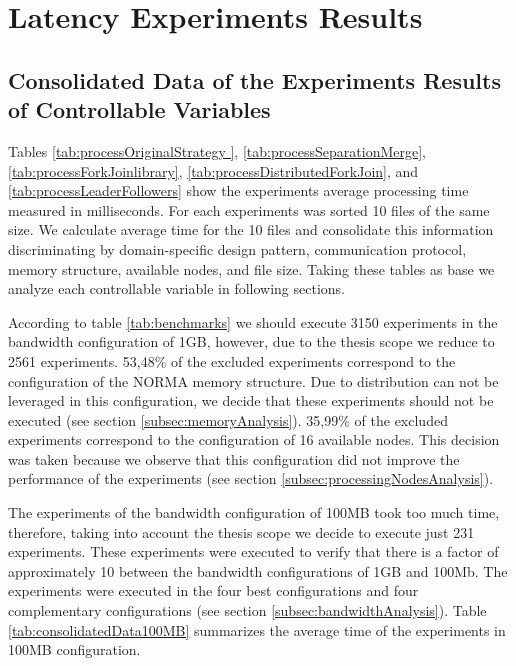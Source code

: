 \section{Latency Experiments Results}

\subsection{Consolidated Data of the Experiments Results of Controllable Variables}

Tables \ref{tab:processOriginalStrategy }, \ref{tab:processSeparationMerge}, \ref{tab:processForkJoinlibrary}, \ref{tab:processDistributedForkJoin}, and \ref{tab:processLeaderFollowers} show the experiments average processing time measured in milliseconds. For each experiments was sorted 10 files of the same size. We calculate average time for the 10 files and consolidate this information discriminating by domain-specific design pattern, communication protocol, memory structure, available nodes, and file size. Taking these tables as base we analyze each controllable variable in following sections.

According to table \ref{tab:benchmarks} we should execute 3150 experiments in the bandwidth configuration of 1GB, however, due to the thesis scope we reduce to 2561 experiments. 53,48\% of the excluded experiments correspond to the configuration of the NORMA memory structure. Due to distribution can not be leveraged in this configuration, we decide that these experiments should not be executed (see section \ref{subsec:memoryAnalysis}). 35,99\% of the excluded experiments correspond to the configuration of 16 available nodes. This decision was taken because we observe that this configuration did not improve the performance of the experiments (see section \ref{subsec:processingNodesAnalysis}).

The experiments of the bandwidth configuration of 100MB took too much time, therefore, taking into account the thesis scope we decide to execute just 231 experiments. These experiments were executed to verify that there is a factor of approximately 10 between the bandwidth configurations of 1GB and 100Mb. The experiments were executed in the four best configurations and four complementary configurations (see section \ref{subsec:bandwidthAnalysis}). Table \ref{tab:consolidatedData100MB} summarizes the average time of the experiments in 100MB configuration.

